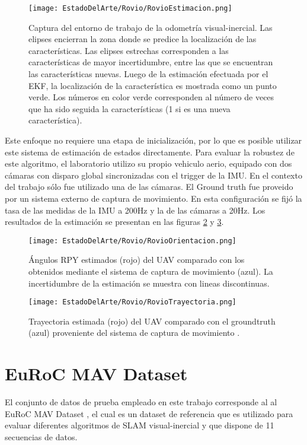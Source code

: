 {\begin{figure}[H]
	\centering
	\texttt{[image: EstadoDelArte/Rovio/RovioEstimacion.png]}
	\caption[Captura del entorno de trabajo de la odometría visual-inercial]{Captura del entorno de trabajo de la odometría visual-inercial. Las elipses encierran la zona donde se predice la localización de las características. Las elipses estrechas corresponden a las características de mayor incertidumbre, entre las que se encuentran las características nuevas. Luego de la estimación efectuada por el EKF, la localización de la característica es mostrada como un punto verde. Los números en color verde corresponden al número de veces que ha sido seguida la características (1 si es una nueva característica).}
	\label{fig:RovioEstimacion}
\end{figure}


Este enfoque no requiere una etapa de inicialización, por lo que es posible utilizar este sistema de estimación de estados directamente. Para evaluar la robustez de este algoritmo, el laboratorio utilizo su propio vehiculo aerio, equipado con dos cámaras con disparo global sincronizadas con el trigger de la IMU. En el contexto del trabajo sólo fue utilizado una de las cámaras. El Ground truth fue proveido por un sistema externo de captura de movimiento. En esta configuración se fijó la tasa de las medidas de la IMU a 200Hz y la de las cámaras a 20Hz. Los resultados de la estimación se presentan en las figuras \ref{fig:RovioOrientacion} y  \ref{fig:RovioTrayectoria}.

\begin{figure}[H]
	\centering
	\texttt{[image: EstadoDelArte/Rovio/RovioOrientacion.png]}
	\caption[Ángulos RPY estimados utilizando ROVIO]{Ángulos RPY estimados (rojo) del UAV comparado con los obtenidos mediante el sistema de captura de movimiento (azul). La incertidumbre de la estimación se muestra con lineas discontinuas. }
	\label{fig:RovioOrientacion}
\end{figure}


\begin{figure}[H]
	\centering
	\texttt{[image: EstadoDelArte/Rovio/RovioTrayectoria.png]}
	\caption[Trayectoria estimada utilizando ROVIO]{Trayectoria estimada (rojo) del UAV comparado con el groundtruth (azul) proveniente del sistema de captura de movimiento .}
	\label{fig:RovioTrayectoria}
\end{figure}



\section{EuRoC MAV Dataset}
El conjunto de datos de prueba empleado en este trabajo corresponde al al EuRoC MAV Dataset \cite{euroc}, el cual es un dataset de referencia que es utilizado para evaluar diferentes algoritmos de SLAM visual-inercial y que dispone de 11 secuencias de datos. \\


}
